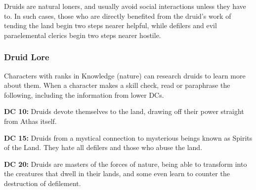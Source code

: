 Druids are natural loners, and usually avoid social interactions unless they have to. In such cases, those who are directly benefited from the druid's work of tending the land begin two steps nearer helpful, while defilers and evil paraelemental clerics begin two steps nearer hostile.

\subsubsection{Druid Lore}

Characters with ranks in Knowledge (nature) can research druids to learn more about them. When a character makes a skill check, read or paraphrase the following, including the information from lower DCs.

\textbf{DC 10:} Druids devote themselves to the land, drawing off their power straight from Athas itself.

\textbf{DC 15:} Druids from a mystical connection to mysterious beings known as Spirits of the Land. They hate all defilers and those who abuse the land.

\textbf{DC 20:} Druids are masters of the forces of nature, being able to transform into the creatures that dwell in their lands, and some even learn to counter the destruction of defilement.
